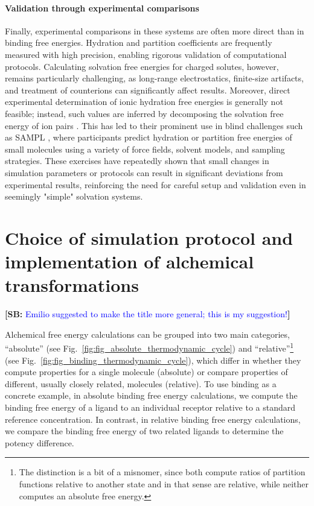\documentclass[9pt,bestpractices]{livecoms}
\newcommand{\sbnote}[1]{%
  {\bfseries{}[SB: }%
  {\textcolor{blue}{#1}}{\bfseries{}]}
}
\begin{document}
\paragraph{Validation through experimental comparisons}  
Finally, experimental comparisons in these systems are often more direct than in binding free energies. Hydration and partition coefficients are frequently measured with high precision, enabling rigorous validation of computational protocols. Calculating solvation free energies for charged solutes, however, remains particularly challenging, as long-range electrostatics, finite-size artifacts, and treatment of counterions can significantly affect results. Moreover, direct experimental determination of ionic hydration free energies is generally not feasible; instead, such values are inferred by decomposing the solvation free energy of ion pairs \cite{mobley2014freesolv}. This has led to their prominent use in blind challenges such as SAMPL \cite{skillman2012sampl3, mobley2014sampl4, bergazin2021sampl7}, where participants predict hydration or partition free energies of small molecules using a variety of force fields, solvent models, and sampling strategies. These exercises have repeatedly shown that small changes in simulation parameters or protocols can result in significant deviations from experimental results, reinforcing the need for careful setup and validation even in seemingly "simple" solvation systems.


\section{Choice of simulation protocol and implementation of alchemical transformations}
  \sbnote{Emilio suggested to make the title more general; this is my suggestion!}
\label{sec:simulation_protocol_choice}
Alchemical free energy calculations can be grouped into two main categories, ``absolute'' (see Fig.~\ref{fig:fig_absolute_thermodynamic_cycle}) and ``relative''\footnote{The distinction is a bit of a misnomer, since both compute ratios of partition functions relative to another state and in that sense are relative, while neither computes an absolute free energy.} (see Fig.~\ref{fig:fig_binding_thermodynamic_cycle}), which differ in whether they compute properties for a single molecule (absolute) or compare properties of different, usually closely related, molecules (relative).
To use binding as a concrete example, in absolute binding free energy calculations, we compute the binding free energy of a ligand to an individual receptor relative to a standard reference concentration. In contrast, in relative binding free energy calculations, we compare the binding free energy of two related ligands to determine the potency difference.
\end{document}
